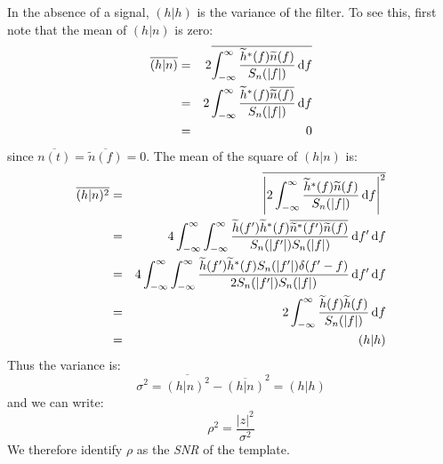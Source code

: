 In the absence of a signal, $(h|h)$ is the variance of the filter. To see this, first note that the mean of $(h|n)$ is zero:
\begin{eqnarray}
\overline{(h|n)} & = & 2 \overline{\int_{-\infty}^{\infty} \frac{\widetilde{h}^{*}(f)\widetilde{n}(f)}{S_n(|f|)} \,\mathrm{d} f} \nonumber \\
 & = & 2 \int_{-\infty}^{\infty} \frac{\widetilde{h}^{*}(f)\overline{\widetilde{n}(f)}}{S_n(|f|)} \,\mathrm{d} f \nonumber \\
 & = & 0
\end{eqnarray}
since $\overline{n(t)} = \overline{\widetilde{n}(f)} = 0$. The mean of the square of $(h|n)$ is:
\begin{eqnarray}
\overline{(h|n)^2} & = & \overline{\left| 2 \int_{-\infty}^{\infty} \frac{\widetilde{h}^{*}(f)\widetilde{n}(f)}{S_n(|f|)} \,\mathrm{d} f \right|^2 } \nonumber \\
 & = & 4 \int_{-\infty}^{\infty} \int_{-\infty}^{\infty} \frac{\widetilde{h}(f')\widetilde{h}^{*}(f)\overline{\widetilde{n}^{*}(f')\widetilde{n}(f)}}{S_n(|f'|)S_n(|f|)} \,\mathrm{d} f' \,\mathrm{d} f \nonumber \\
 & = & 4 \int_{-\infty}^{\infty} \int_{-\infty}^{\infty} \frac{\widetilde{h}(f')\widetilde{h}^{*}(f) S_n(|f'|)\delta(f'-f)}{2 S_n(|f'|)S_n(|f|)} \,\mathrm{d} f' \,\mathrm{d} f \nonumber \\
 & = & 2 \int_{-\infty}^{\infty} \frac{\widetilde{h}(f)\widetilde{h}(f)}{S_n(|f|)} \,\mathrm{d} f \nonumber \\
 & = & (h|h)
\end{eqnarray}
Thus the variance is:
\begin{equation}
\sigma^2 = \overline{(h|n)^2} - \overline{(h|n)}^2 = (h|h)
\end{equation}
and we can write:
\begin{equation}
\label{eqn:SNR}
\rho^2 = \frac{|z|^2}{\sigma^2}
\end{equation}
We therefore identify $\rho$ as the \emph{\ac{SNR}} of the template.

